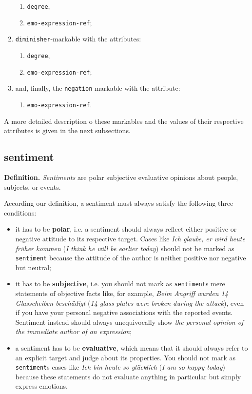 \documentclass[11pt,a4paper]{article}
\theoremstyle{mytheoremstyle}
\begin{document}
\begin{multicols}{2}
\begin{enumerate}
    \begin{enumerate}
    \item \texttt{degree},
    \item \texttt{emo-expression-ref};
    \end{enumerate}
  \item \texttt{diminisher}-markable with the attributes:
    \begin{enumerate}
    \item \texttt{degree},
    \item \texttt{emo-expression-ref};
    \end{enumerate}
  \item and, finally, the \texttt{negation}-markable with the
    attribute:
    \begin{enumerate}
    \item \texttt{emo-expression-ref}.
    \end{enumerate}
  \end{enumerate}
\end{multicols}
\noindent{}A more detailed description o these markables and the
values of their respective attributes is given in the next
subsections.

\subsection{sentiment}\label{sec:sentiment}
\noindent\textbf{Definition.} \emph{Sentiments} are polar subjective
evaluative opinions about people, subjects, or events.

According our definition, a sentiment must always satisfy the
following three conditions:
\begin{itemize}
\item it has to be \textbf{polar}, i.e. a sentiment should always
  reflect either positive or negative attitude to its respective
  target.  Cases like \textit{Ich glaube, er wird heute fr\"uher
    kommen} (\textit{I think he will be earlier today}) should not be
  marked as \texttt{sentiment} because the attitude of the author is
  neither positive nor negative but neutral;

\item it has to be \textbf{subjective}, i.e. you should not mark as
  \texttt{sentiment}s mere statements of objective facts like, for
  example, \textit{Beim Angriff wurden 14 Glasscheiben besch\"adigt}
  (\textit{14 glass plates were broken during the attack}), even if
  you have your personal negative associations with the reported
  events.  Sentiment instead should always unequivocally show
  \emph{the personal opinion of the immediate author of an
    expression};

\item a sentiment has to be \textbf{evaluative}, which means that it
  should always refer to an explicit target and judge about its
  properties.  You should not mark as \texttt{sentiment}s cases like
  \textit{Ich bin heute so gl\"ucklich} (\textit{I am so happy today})
  because these statements do not evaluate anything in particular but
  simply express emotions.
\end{itemize}
\end{document}
